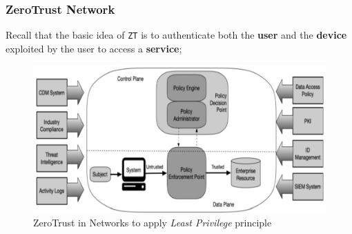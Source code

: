 \subsubsection{ZeroTrust Network}

Recall that the basic idea of \texttt{ZT} is to authenticate both the \textbf{user} and the \textbf{device} exploited by the user to access a \textbf{service};

\begin{figure}[htbp]
   \centering
   \includegraphics{images/leastprivilege_zerotrust.png}
   \caption{ZeroTrust in Networks to apply \textit{Least Privilege} principle}
   \label{fig:leastprivilege_zerotrust}
\end{figure}

